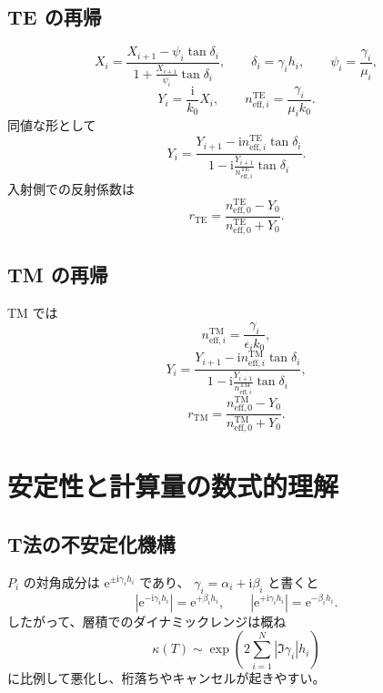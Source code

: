 \documentclass[a4paper,11pt]{article}
\newcommand{\ii}{\mathrm{i}}
\newcommand{\ee}{\mathrm{e}}
\begin{document}
\subsection{TE の再帰}
\begin{equation}
X_i=\frac{X_{i+1}-\psi_i\tan\delta_i}{1+\frac{X_{i+1}}{\psi_i}\tan\delta_i},
\qquad
\delta_i=\gamma_i h_i,\qquad
\psi_i=\frac{\gamma_i}{\mu_i},
\end{equation}
\begin{equation}
Y_i=\frac{\ii}{k_0}X_i,\qquad
n_{\mathrm{eff},i}^{\mathrm{TE}}=\frac{\gamma_i}{\mu_i k_0}.
\end{equation}
同値な形として
\begin{equation}
Y_i=
\frac{Y_{i+1}-\ii n_{\mathrm{eff},i}^{\mathrm{TE}}\tan\delta_i}
{1-\ii\frac{Y_{i+1}}{n_{\mathrm{eff},i}^{\mathrm{TE}}}\tan\delta_i}.
\end{equation}
入射側での反射係数は
\begin{equation}
r_{\mathrm{TE}}=
\frac{n_{\mathrm{eff},0}^{\mathrm{TE}}-Y_0}
{n_{\mathrm{eff},0}^{\mathrm{TE}}+Y_0}.
\end{equation}

\subsection{TM の再帰}
TM では
\begin{equation}
n_{\mathrm{eff},i}^{\mathrm{TM}}=\frac{\gamma_i}{\epsilon_i k_0},
\end{equation}
\begin{equation}
Y_i=
\frac{Y_{i+1}-\ii n_{\mathrm{eff},i}^{\mathrm{TM}}\tan\delta_i}
{1-\ii\frac{Y_{i+1}}{n_{\mathrm{eff},i}^{\mathrm{TM}}}\tan\delta_i},
\end{equation}
\begin{equation}
r_{\mathrm{TM}}=
\frac{n_{\mathrm{eff},0}^{\mathrm{TM}}-Y_0}
{n_{\mathrm{eff},0}^{\mathrm{TM}}+Y_0}.
\end{equation}

\section{安定性と計算量の数式的理解}

\subsection{T法の不安定化機構}
$P_i$ の対角成分は $\ee^{\pm \ii\gamma_i h_i}$ であり、
$\gamma_i=\alpha_i+\ii\beta_i$ と書くと
\begin{equation}
\left|\ee^{-\ii\gamma_i h_i}\right|=\ee^{+\beta_i h_i},\qquad
\left|\ee^{+\ii\gamma_i h_i}\right|=\ee^{-\beta_i h_i}.
\end{equation}
したがって、層積でのダイナミックレンジは概ね
\begin{equation}
\kappa(T)\sim
\exp\!\left(2\sum_{i=1}^N |\Im \gamma_i|h_i\right)
\end{equation}
に比例して悪化し、桁落ちやキャンセルが起きやすい。
\end{document}
